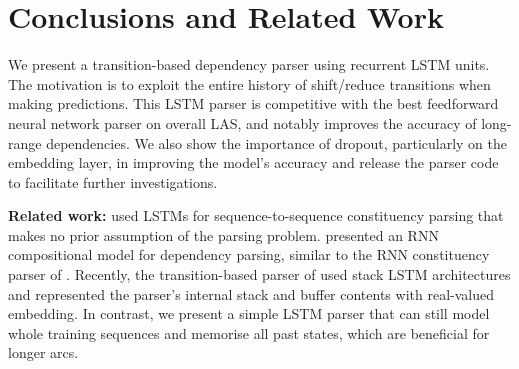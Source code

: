 


\section{Conclusions and Related Work}

We present a transition-based dependency parser using recurrent LSTM units. The motivation is to exploit the entire history of shift/reduce transitions when making predictions. This LSTM parser is competitive with the best feedforward neural network parser \cite{chenmanning14} on overall LAS, and notably improves the accuracy of long-range dependencies. We also show the importance of dropout, particularly on the embedding layer, in improving the model's accuracy and release the parser code to facilitate further investigations. 

{\bf Related work:} %
 used LSTMs for sequence-to-sequence constituency parsing that makes no prior assumption of the parsing problem.
 presented an RNN compositional model for dependency parsing, similar to the RNN constituency parser of . 
Recently, the transition-based parser of  used stack LSTM architectures and represented the parser's internal stack and buffer contents with real-valued embedding.
In contrast, we present a simple LSTM parser that can still model whole training sequences and memorise all past states, which are beneficial for longer arcs. 





